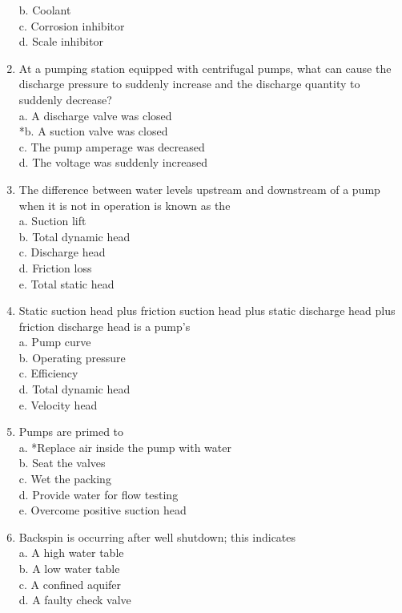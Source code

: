 \begin{enumerate}[1.]
b. Coolant\\
c. Corrosion inhibitor\\
d. Scale inhibitor\\
\item At a pumping station equipped with centrifugal pumps, what can cause the discharge pressure to suddenly increase and the discharge quantity to suddenly decrease?\\
a. A discharge valve was closed\\
*b. A suction valve was closed\\
c. The pump amperage was decreased\\
d. The voltage was suddenly increased\\
\item The difference between water levels upstream and downstream of a pump when it is not in operation is known as the\\
a. Suction lift\\
b. Total dynamic head\\
c. Discharge head\\
d. Friction loss\\
e. Total static head\\
\item Static suction head plus friction suction head plus static discharge head plus friction discharge head is a pump's\\
a. Pump curve\\
b. Operating pressure\\
c. Efficiency\\
d. Total dynamic head\\
e. Velocity head\\
\item Pumps are primed to\\
a. *Replace air inside the pump with water\\
b. Seat the valves\\
c. Wet the packing\\
d. Provide water for flow testing\\
e. Overcome positive suction head\\
\item Backspin is occurring after well shutdown; this indicates\\
a. A high water table\\
b. A low water table\\
c. A confined aquifer\\
d. A faulty check valve\\

\end{enumerate}
